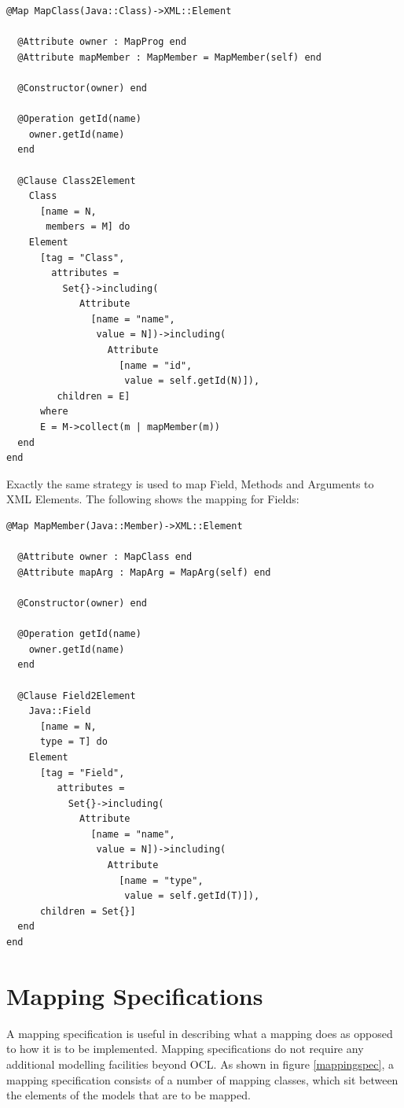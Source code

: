 \begin{lstlisting}
@Map MapClass(Java::Class)->XML::Element

  @Attribute owner : MapProg end
  @Attribute mapMember : MapMember = MapMember(self) end

  @Constructor(owner) end

  @Operation getId(name)
    owner.getId(name)
  end

  @Clause Class2Element
    Class
      [name = N,
       members = M] do
    Element
      [tag = "Class",
        attributes =
          Set{}->including(
             Attribute
               [name = "name",
                value = N])->including(
                  Attribute
                    [name = "id",
                     value = self.getId(N)]),
         children = E]
      where
      E = M->collect(m | mapMember(m))
  end
end
\end{lstlisting}\noindent Exactly the same strategy is used to map Field, Methods
and Arguments to XML Elements. The following shows the mapping for
Fields:


\begin{lstlisting}
@Map MapMember(Java::Member)->XML::Element

  @Attribute owner : MapClass end
  @Attribute mapArg : MapArg = MapArg(self) end

  @Constructor(owner) end

  @Operation getId(name)
    owner.getId(name)
  end

  @Clause Field2Element
    Java::Field
      [name = N,
      type = T] do
    Element
      [tag = "Field",
         attributes =
           Set{}->including(
             Attribute
               [name = "name",
                value = N])->including(
                  Attribute
                    [name = "type",
                     value = self.getId(T)]),
      children = Set{}]
  end
end
\end{lstlisting}
\section{Mapping Specifications}

A mapping specification is useful in describing what a mapping
does as opposed to how it is to be implemented. Mapping
specifications do not require any additional modelling facilities
beyond OCL. As shown in figure \ref{mappingspec}, a mapping
specification consists of a number of mapping classes, which sit
between the elements of the models that are to be mapped.

